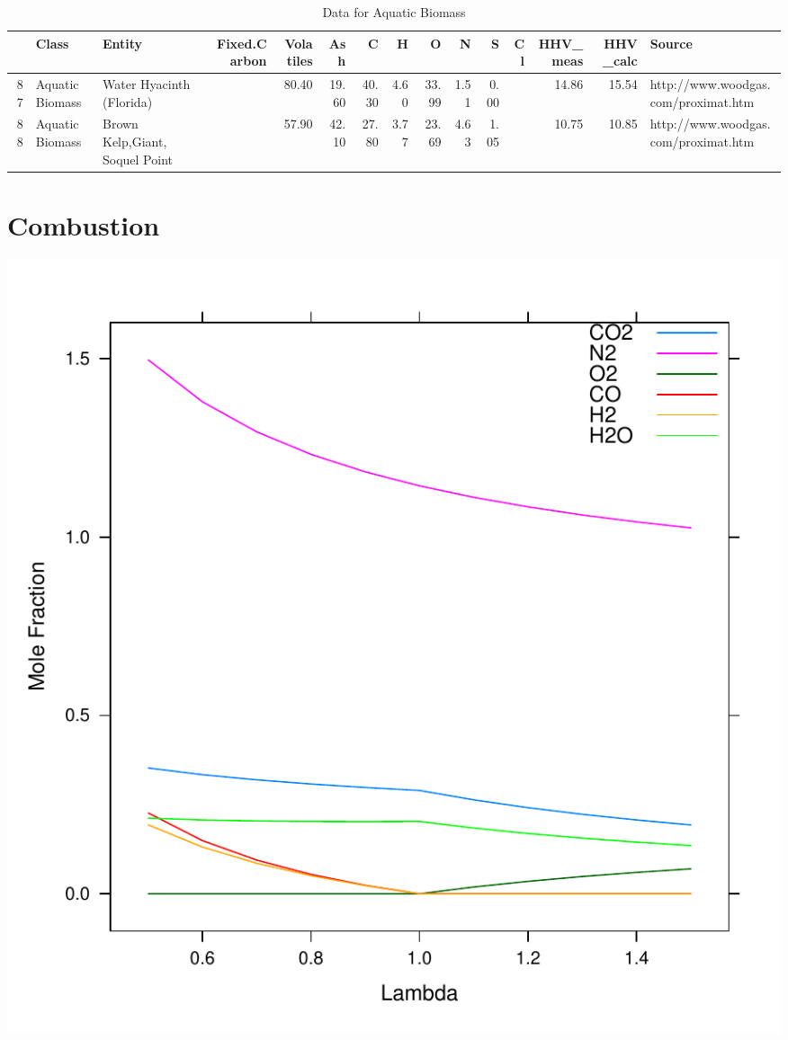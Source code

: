 \documentclass[a4paper]{article}
\begin{document}
\begin{table}[ht]
\begin{center}
\begin{tabular}{rllrrrrrrrrrrrl}
  \hline
 & Class & Entity & Fixed.Carbon & Volatiles & Ash & C & H & O & N & S & Cl & HHV\_meas & HHV\_calc & Source \\ 
  \hline
87 & Aquatic Biomass & Water Hyacinth (Florida) &  & 80.40 & 19.60 & 40.30 & 4.60 & 33.99 & 1.51 & 0.00 &  & 14.86 & 15.54 & http://www.woodgas.com/proximat.htm \\ 
  88 & Aquatic Biomass & Brown Kelp,Giant, Soquel Point &  & 57.90 & 42.10 & 27.80 & 3.77 & 23.69 & 4.63 & 1.05 &  & 10.75 & 10.85 & http://www.woodgas.com/proximat.htm \\ 
   \hline
\end{tabular}
\caption{Data for Aquatic Biomass}
\end{center}
\end{table}
\section{Combustion}
\includegraphics{images/img-007}
\\
\end{document}
